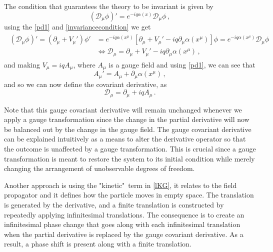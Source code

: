 The condition that guarantees the theory to be invariant is given by
\begin{equation}
	\label{invariancecondition}
	(\mathcal{D}_\mu \phi)'=e^{-iq\alpha(x)}\mathcal{D}_\mu \phi\,,
\end{equation}
using the \autoref{pd1} and \autoref{invariancecondition} we get
\begin{align}
	\begin{array}{ll}
		(\mathcal{D}_\mu \phi)'=(\partial_\mu+V_\mu')\phi'&=e^{-iq\alpha(x^\mu)}\left[\partial_\mu+V_\mu'-iq\partial_\mu\alpha(x^\mu)\right]\phi =e^{-iq\alpha(x^\mu)}\mathcal{D}_\mu \phi \\
		& \Leftrightarrow \mathcal{D}_\mu=\partial_\mu+V_\mu'-iq\partial_\mu\alpha(x^\mu)\,,
	\end{array}
\end{align}
and making $V_\mu=iqA_\mu$, where $A_\mu$ is a gauge field and using \autoref{pd1}, we can see that
\begin{equation}
	\label{gaugefieldchange}
	A_\mu'=A_\mu+\partial_\mu\alpha(x^\mu)\,,
\end{equation}
and so we can now define the covariant derivative, as
\begin{equation}
	\label{covdev}
	\mathcal{D}_\mu = \partial_\mu + iqA_\mu\,.
\end{equation}

Note that this gauge covariant derivative will remain unchanged whenever we apply a gauge transformation since the change in the partial derivative will now be balanced out by the change in the gauge field. The gauge covariant derivative can be explained intuitively as a means to alter the derivative operator so that the outcome is unaffected by a gauge transformation.
This is crucial since a gauge transformation is meant to restore the system to its initial condition while merely changing the arrangement of unobservable degrees of freedom.

Another approach is using the "kinetic"\ term in \autoref{lKG}, it relates to the field propagator and it defines how the particle moves in empty space.
The translation is generated by the derivative, and a finite translation is constructed by repeatedly applying infinitesimal translations.
The consequence is to create an infinitesimal phase change that goes along with each infinitesimal translation when the partial derivative is replaced by the gauge covariant derivative.
As a result, a phase shift is present along with a finite translation. 

